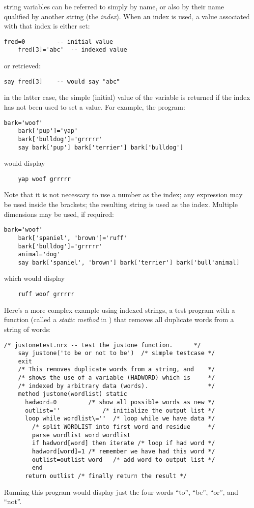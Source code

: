 \nr{} string variables can be referred to simply by name, or also by
their name qualified by another string (the \emph{index}). When an index is
used, a value associated with that index is either set:
\begin{lstlisting}[label=index,caption=Index]
    fred=0         -- initial value
    fred[3]='abc'  -- indexed value
\end{lstlisting}
or retrieved:
\begin{lstlisting}[label=retrieving,caption=Retrieving]
    say fred[3]    -- would say "abc"
\end{lstlisting}
in the latter case, the simple (initial) value of the variable is
returned if the index has not been used to set a value. For example,
the program:
\begin{lstlisting}[label=woof,caption=Woof]
    bark='woof'
    bark['pup']='yap'
    bark['bulldog']='grrrrr'
    say bark['pup'] bark['terrier'] bark['bulldog']
\end{lstlisting}
would display
\begin{lstlisting}
    yap woof grrrrr
\end{lstlisting}
Note that it is not necessary to use a number as the index; any
expression may be used inside the brackets; the resulting string is
used as the index. Multiple dimensions may be used, if required:
\begin{lstlisting}[label=dimensions,caption=Multiple Dimensions]
    bark='woof'
    bark['spaniel', 'brown']='ruff'
    bark['bulldog']='grrrrr'
    animal='dog'
    say bark['spaniel', 'brown'] bark['terrier'] bark['bull'animal]
\end{lstlisting}
which would display
\begin{lstlisting}
    ruff woof grrrrr
\end{lstlisting}
Here’s a more complex example using indexed strings, a test program
with a function (called a \emph{static method} in \nr{}) that removes all
duplicate words from a string of words:
\begin{lstlisting}[label=refjust1,caption=justonetest.nrx]
    /* justonetest.nrx -- test the justone function.      */
    say justone('to be or not to be')  /* simple testcase */
    exit
    /* This removes duplicate words from a string, and    */
    /* shows the use of a variable (HADWORD) which is     */
    /* indexed by arbitrary data (words).                 */
    method justone(wordlist) static
      hadword=0         /* show all possible words as new */
      outlist=''            /* initialize the output list */
      loop while wordlist\=''  /* loop while we have data */
        /* split WORDLIST into first word and residue     */
        parse wordlist word wordlist
        if hadword[word] then iterate /* loop if had word */
        hadword[word]=1 /* remember we have had this word */
        outlist=outlist word   /* add word to output list */
        end
      return outlist /* finally return the result */
\end{lstlisting}
Running this program would display just the four words “to”, “be”, “or”, and “not”.
